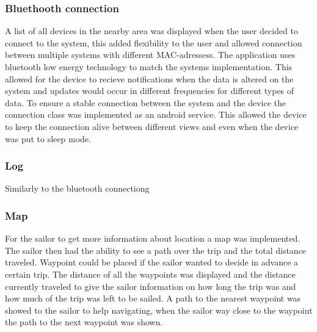 \subsubsection{Bluethooth connection}
A list of all devices in the nearby area was displayed when the user decided to connect to the system, this added flexibility to the user and allowed connection between multiple systems with different MAC-adressess. The application uses bluetooth low energy technology to match the systems implementation. This allowed for the device to recieve notifications when the data is altered on the system and updates would occur in different frequencies for different types of data. To ensure a stable connection between the system and the device the connection class was implemented as an android service\cite{android-service}. This allowed the device to keep the connection alive between different views and even when the device was put to sleep mode.

\subsubsection{Log}
Similarly to the bluetooth connectiong

\subsubsection{Map}
For the sailor to get more information about location a map was implemented. The sailor then had the ability to see a path over the trip and the total distance traveled. Waypoint could be placed if the sailor wanted to decide in advance a certain trip. The distance of all the waypoints was displayed and the distance currently traveled to give the sailor information on how long the trip was and how much of the trip was left to be sailed. A path to the nearest waypoint was showed to the sailor to help navigating, when the sailor way close to the waypoint the path to the next waypoint was shown.
